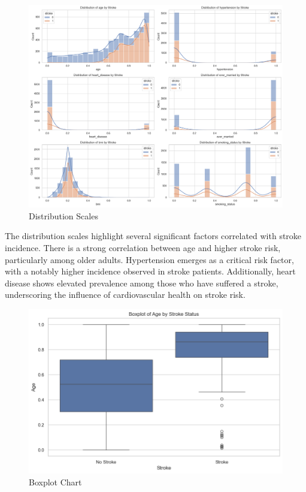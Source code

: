 \documentclass[runningheads]{llncs}
\begin{document}
\begin{enumerate}
\begin{figure}
    \centering
    \includegraphics[width=1.0\linewidth]{eda1.png}
    \caption{Distribution Scales} 
    \label{fig:enter-label}
\end{figure}

The distribution scales highlight several significant factors correlated with stroke incidence. There is a strong correlation between age and higher stroke risk, particularly among older adults. Hypertension emerges as a critical risk factor, with a notably higher incidence observed in stroke patients. Additionally, heart disease shows elevated prevalence among those who have suffered a stroke, underscoring the influence of cardiovascular health on stroke risk.

\newpage
\begin{figure}
    \centering
    \includegraphics[width=1.0\linewidth]{eda2.png}
    \caption{Boxplot Chart} 
    \label{fig:enter-label}
\end{figure}


\end{enumerate}
\end{document}
